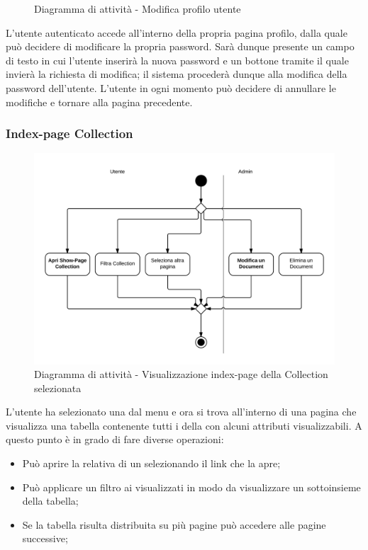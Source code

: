 \begin{figure}[H]
\caption{Diagramma di attività - Modifica profilo utente}
\end{figure}

L'utente autenticato accede all'interno della propria pagina profilo, dalla quale può decidere di modificare la propria password. Sarà dunque presente un campo di testo in cui l'utente inserirà la nuova password e un bottone tramite il quale invierà la richiesta di modifica; il sistema  procederà dunque alla modifica della password dell'utente. L'utente in ogni momento può decidere di annullare le modifiche e tornare alla pagina precedente.

\subsubsection{Index-page Collection}

\begin{figure}[H]
\centering
\includegraphics[scale=0.2]{uml/MaaP - Index-page.png}
\caption{Diagramma di attività - Visualizzazione index-page della Collection selezionata}
\end{figure}

L'utente ha selezionato una  dal menu e ora si trova all'interno di una pagina che visualizza una tabella contenente tutti i  della  con alcuni attributi visualizzabili. A questo punto è in grado di fare diverse operazioni:

\begin{itemize}

	\item Può aprire la relativa  di un  selezionando il link che la apre;
	\item Può applicare un filtro ai  visualizzati in modo da visualizzare un sottoinsieme della tabella;
	\item Se la tabella risulta distribuita su più pagine può accedere alle pagine successive;

\end{itemize}

